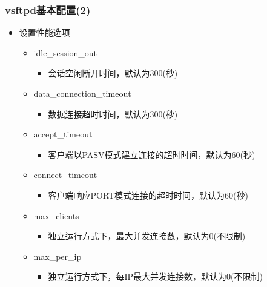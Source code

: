 \documentclass[xcolor=svgnames,presentation]{beamer}
\begin{document}
\begin{frame}
\frametitle{vsftpd基本配置(2)}
\label{sec-3-4}
\begin{itemize}

\item 设置性能选项
\label{sec-3-4-1}%
\begin{itemize}

\item idle\_session\_out
\label{sec-3-4-1-1}%
\begin{itemize}

\item 会话空闲断开时间，默认为300(秒)
\label{sec-3-4-1-1-1}%
\end{itemize} %

\item data\_connection\_timeout
\label{sec-3-4-1-2}%
\begin{itemize}

\item 数据连接超时时间，默认为300(秒)
\label{sec-3-4-1-2-1}%
\end{itemize} %

\item accept\_timeout
\label{sec-3-4-1-3}%
\begin{itemize}

\item 客户端以PASV模式建立连接的超时时间，默认为60(秒)
\label{sec-3-4-1-3-1}%
\end{itemize} %

\item connect\_timeout
\label{sec-3-4-1-4}%
\begin{itemize}

\item 客户端响应PORT模式连接的超时时间，默认为60(秒)
\label{sec-3-4-1-4-1}%
\end{itemize} %

\item max\_clients
\label{sec-3-4-1-5}%
\begin{itemize}

\item 独立运行方式下，最大并发连接数，默认为0(不限制)
\label{sec-3-4-1-5-1}%
\end{itemize} %

\item max\_per\_ip
\label{sec-3-4-1-6}%
\begin{itemize}

\item 独立运行方式下，每IP最大并发连接数，默认为0(不限制)
\label{sec-3-4-1-6-1}%
\end{itemize} %


\end{itemize}
\end{itemize}
\end{frame}
\end{document}
